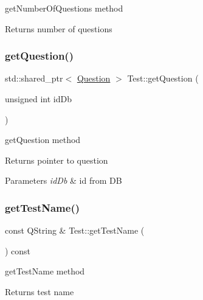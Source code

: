 get\+Number\+Of\+Questions method 

\begin{DoxyReturn}{Returns}
number of questions 
\end{DoxyReturn}
\mbox{\label{class_test_a4ce90338ac98d4d152d2e50a98645d73}} 
\subsubsection{\texorpdfstring{get\+Question()}{getQuestion()}}
{\footnotesize\ttfamily std\+::shared\+\_\+ptr$<$ \hyperlink{class_question}{Question} $>$ Test\+::get\+Question (\begin{DoxyParamCaption}\item[{unsigned int}]{id\+Db }\end{DoxyParamCaption})}



get\+Question method 

\begin{DoxyReturn}{Returns}
pointer to question 
\end{DoxyReturn}

\begin{DoxyParams}{Parameters}
{\em id\+Db} & id from DB \\
\hline
\end{DoxyParams}
\mbox{\label{class_test_a022aa62fa86d7436c33ba58f8e410389}} 
\subsubsection{\texorpdfstring{get\+Test\+Name()}{getTestName()}}
{\footnotesize\ttfamily const Q\+String \& Test\+::get\+Test\+Name (\begin{DoxyParamCaption}{ }\end{DoxyParamCaption}) const}



get\+Test\+Name method 

\begin{DoxyReturn}{Returns}
test name 
\end{DoxyReturn}
\mbox{\label{class_test_a1c8e2f9b62f0643ca5e2e1484e996df6}} 
